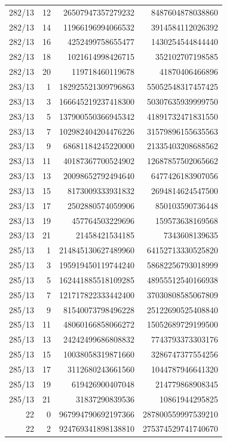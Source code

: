 \begin{longtable}{@{}rrrr@{}}
282/13 & 12 & 26507947357279232 & 8487604878038860\\
282/13 & 14 & 11966196994066532 & 3914584112026392\\
282/13 & 16 & 4252499758655477 & 1430254544844440\\
282/13 & 18 & 1021614998426715 & 352102707198585\\
282/13 & 20 & 119718460119678 & 41870406466896\\
283/13 & 1 & 182925521309796863 & 55052548317457425\\
283/13 & 3 & 166645219237418300 & 50307635939999750\\
283/13 & 5 & 137900550366945342 & 41891732471831550\\
283/13 & 7 & 102982404204476226 & 31579896155635563\\
283/13 & 9 & 68681184245220000 & 21335403208688562\\
283/13 & 11 & 40187367700524902 & 12687857502065662\\
283/13 & 13 & 20098652792494640 & 6477426183907056\\
283/13 & 15 & 8173009333931832 & 2694814624547500\\
283/13 & 17 & 2502880574059906 & 850103590736448\\
283/13 & 19 & 457764503229696 & 159573638169568\\
283/13 & 21 & 21458421534185 & 7343608139635\\
285/13 & 1 & 214845130627489960 & 64152713330525820\\
285/13 & 3 & 195919450119744240 & 58682256793018999\\
285/13 & 5 & 162441885518109285 & 48955512540166938\\
285/13 & 7 & 121717822333442400 & 37030808585067809\\
285/13 & 9 & 81540073798496228 & 25122690525408840\\
285/13 & 11 & 48060166858066272 & 15052689729199500\\
285/13 & 13 & 24242499686808832 & 7743793373303176\\
285/13 & 15 & 10038058319871660 & 3286747377554256\\
285/13 & 17 & 3112680243661560 & 1044787946641320\\
285/13 & 19 & 619426900407048 & 214779868908345\\
285/13 & 21 & 31837290839536 & 10861944295825\\
22 & 0 & 967994790692197366 & 287800559997539210\\
22 & 2 & 924769341898138810 & 275374529741740670\\

\end{longtable}
